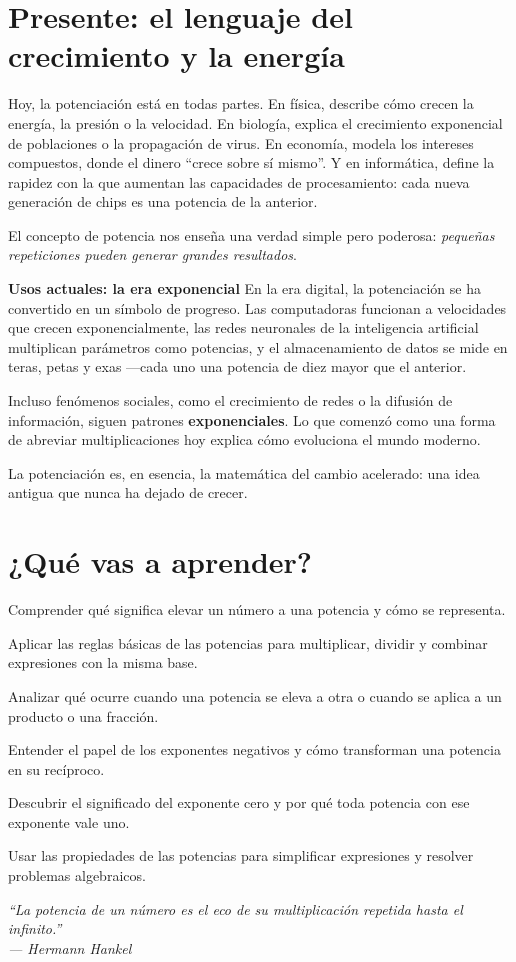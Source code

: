 \section*{Presente: el lenguaje del crecimiento y la energía}
\begin{reseñaplana}

Hoy, la potenciación está en todas partes.  
En física, describe cómo crecen la energía, la presión o la velocidad.  
En biología, explica el crecimiento exponencial de poblaciones o la propagación de virus.  
En economía, modela los intereses compuestos, donde el dinero “crece sobre sí mismo”.  
Y en informática, define la rapidez con la que aumentan las capacidades de procesamiento: 
cada nueva generación de chips es una potencia de la anterior.  

El concepto de potencia nos enseña una verdad simple pero 
poderosa: \textit{pequeñas repeticiones pueden generar grandes resultados}.  

\textbf{Usos actuales: la era exponencial}  
En la era digital, la potenciación se ha convertido en un símbolo de progreso.  
Las computadoras funcionan a velocidades que crecen exponencialmente, las redes neuronales de la inteligencia 
artificial multiplican parámetros como potencias, y el almacenamiento de datos se mide en teras, 
petas y exas —cada uno una potencia de diez mayor que el anterior.  

Incluso fenómenos sociales, como el crecimiento de redes o la difusión de información, siguen patrones \textbf{exponenciales}.  
Lo que comenzó como una forma de abreviar multiplicaciones hoy explica cómo evoluciona el mundo moderno.  

La potenciación es, en esencia, la matemática del cambio acelerado:  
una idea antigua que nunca ha dejado de crecer.
\end{reseñaplana}

\section*{¿Qué vas a aprender?}
\begin{aprende}
  \item Comprender qué significa elevar un número a una potencia y cómo se representa.  
  \item Aplicar las reglas básicas de las potencias para multiplicar, dividir y combinar expresiones con la misma base.  
  \item Analizar qué ocurre cuando una potencia se eleva a otra o cuando se aplica a un producto o una fracción.  
  \item Entender el papel de los exponentes negativos y cómo transforman una potencia en su recíproco.  
  \item Descubrir el significado del exponente cero y por qué toda potencia con ese exponente vale uno.  
  \item Usar las propiedades de las potencias para simplificar expresiones y resolver problemas algebraicos.  
\end{aprende}

\vspace{1.2cm} %
\begin{flushright}
  {\fontsize{12}{14}\selectfont\itshape
  ``La potencia de un número es el eco de su multiplicación repetida hasta el infinito.''\\[6pt]
  — Hermann Hankel}%
\end{flushright}



